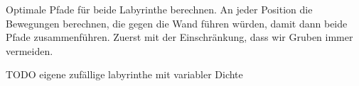 \documentclass[11pt]{article}
\begin{document}
   Optimale Pfade für beide Labyrinthe berechnen.
    An jeder Position die Bewegungen berechnen, die gegen die Wand führen würden,
    damit dann beide Pfade zusammenführen.
    Zuerst mit der Einschränkung, dass wir Gruben immer vermeiden.

    TODO eigene zufällige labyrinthe mit variabler Dichte
\end{document}
